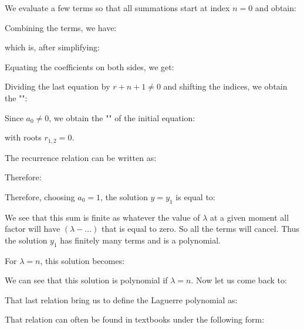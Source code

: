 	We evaluate a few terms so that all summations start at index $n=0$ and obtain:
	
	Combining the terms, we have:
	
	which is, after simplifying:
	
	Equating the coefficients on both sides, we get:
	
	Dividing the last equation by $r+n+1 \neq 0$ and shifting the indices, we obtain the "":
	
	Since $a_{0} \neq 0$, we obtain the "" of the initial equation:
	
	with roots $r_{1,2}=0$.
	
	The recurrence relation can be written as:
	
	Therefore:
	
	
	Therefore, choosing $a_{0}=1$, the solution $y=y_{1}$ is equal to:
	
	We see that this sum is finite as whatever the value of $\lambda$ at a given moment all factor will have $(\lambda-\ldots)$ that is equal to zero. So all the terms will cancel. Thus the solution $y_1$ has finitely many terms and is a polynomial.
	
	For $\lambda=n$, this solution becomes:
	
	We can see that this solution is polynomial if $\lambda=n$. Now let us come back to:
	
	That last relation bring us to define the Laguerre polynomial as:
	
	That relation can often be found in textbooks under the following form:
	
